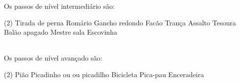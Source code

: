 Os passos de nível intermediário são:
\begin{tasks}(2)
\task Tirada de perna
\task Romário
\task Gancho redondo
\task Facão
\task Trança
\task Assalto
\task Tesoura
\task Balão apagado
\task Mestre sala
\task Escovinha
\end{tasks}~\\

Os passos de nível avançado são:
\begin{tasks}(2)
\task Pião
\task Picadinho ou ou picadilho
\task Bicicleta
\task Pica-pau
\task Enceradeira
\end{tasks}


